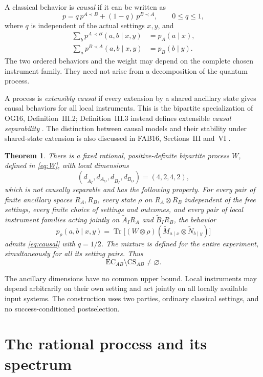 \documentclass[11pt,letterpaper]{article}
\newtheorem{theorem}{Theorem}
\theoremstyle{remark}\newtheorem{remark}[theorem]{Remark}
\newcommand{\Tr}{\operatorname{Tr}}
\newcommand{\Ain}{\widetilde A_I}
\newcommand{\Bin}{\widetilde B_I}
\begin{document}
A classical behavior is \emph{causal} if it can be written as
\begin{equation}\label{eq:causal}
 p=q\,p^{A\prec B}+(1-q)\,p^{B\prec A},\qquad 0\le q\le1,
\end{equation}
where $q$ is independent of the actual settings $x,y$, and
\begin{align*}
 \sum_b p^{A\prec B}(a,b\mid x,y)&=p_A(a\mid x),\\
 \sum_a p^{B\prec A}(a,b\mid x,y)&=p_B(b\mid y).
\end{align*}
The two ordered behaviors and the weight may depend on the complete chosen instrument family. They need not arise from a decomposition of the quantum process.

A process is \emph{extensibly causal} if every extension by a shared ancillary state gives causal behaviors for all local instruments. This is the bipartite specialization of OG16, Definition~III.2; Definition~III.3 instead defines extensible \emph{causal separability} \cite{OG16}. The distinction between causal models and their stability under shared-state extension is also discussed in FAB16, Sections~III and~VI \cite{FAB16}.

\begin{theorem}\label{thm:main}
There is a fixed rational, positive-definite bipartite process $W$, defined in \eqref{eq:W}, with local dimensions
\[
 (d_{\Ain},d_{A_O},d_{\Bin},d_{B_O})=(4,2,4,2),
\]
which is not causally separable and has the following property. For every pair of finite ancillary spaces $R_A,R_B$, every state $\rho$ on $R_A\otimes R_B$ independent of the free settings, every finite choice of settings and outcomes, and every pair of local instrument families acting jointly on $\Ain R_A$ and $\Bin R_B$, the behavior
\[
 p_\rho(a,b\mid x,y)
 =\Tr\bigl[(W\otimes\rho)(\widetilde M_{a\mid x}\otimes
      \widetilde N_{b\mid y})\bigr]
\]
admits \eqref{eq:causal} with $q=1/2$. The mixture is defined for the entire experiment, simultaneously for all its setting pairs. Thus
\[
 \mathrm{EC}_{AB}\setminus\mathrm{CS}_{AB}\ne\varnothing.
\]
\end{theorem}

The ancillary dimensions have no common upper bound. Local instruments may depend arbitrarily on their own setting and act jointly on all locally available input systems. The construction uses two parties, ordinary classical settings, and no success-conditioned postselection.

\section{The rational process and its spectrum}\label{sec:process}
\end{document}
